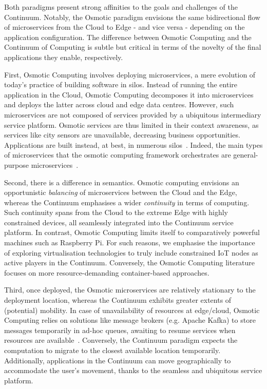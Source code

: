 Both paradigms present strong affinities to the goals and challenges of the Continuum. Notably, the Osmotic paradigm envisions the same bidirectional flow of microservices from the Cloud to Edge - and vice versa - depending on the application configuration. The difference between Osmotic Computing and the Continuum of Computing is subtle but critical in terms of the novelty of the final applications they enable, respectively.

First, Osmotic Computing involves deploying microservices, a mere evolution of today's practice of building software in silos. Instead of running the entire application in the Cloud, Osmotic Computing decomposes it into microservices and deploys the latter across cloud and edge data centres. However, such microservices are not composed of services provided by a ubiquitous intermediary service platform. Osmotic services are thus limited in their context awareness, as services like city sensors are unavailable, decreasing business opportunities. Applications are built instead, at best, in numerous silos~\cite{CAMERO201984}. Indeed, the main types of microservices that the osmotic computing framework orchestrates are general-purpose microservices~\cite{villari2016osmotic}.

Second, there is a difference in semantics. Osmotic computing envisions an opportunistic \textit{balancing} of microservices between the Cloud and the Edge, whereas the Continuum emphasises a wider \textit{continuity} in terms of computing. Such continuity spans from the Cloud to the extreme Edge with highly constrained devices, all seamlessly integrated into the Continuum service platform. In contrast, Osmotic Computing limits itself to comparatively powerful machines such as Raspberry Pi. For such reasons, we emphasise the importance of exploring virtualisation technologies to truly include constrained IoT nodes as active players in the Continuum. 
Conversely, the Osmotic Computing literature focuses on more resource-demanding container-based approaches.

Third, once deployed, the Osmotic microservices are relatively stationary to the deployment location, whereas the Continuum exhibits greater extents of (potential) mobility. In case of unavailability of resources at edge/cloud, Osmotic Computing relies on solutions like message brokers (e.g. Apache Kafka) to store messages temporarily in ad-hoc queues, awaiting to resume services when resources are available~\cite{neha2022systematic}. 
Conversely, the Continuum paradigm expects the computation to migrate to the closest available location temporarily. Additionally, applications in the Continuum can move geographically to accommodate the user's movement, thanks to the seamless and ubiquitous service platform.

